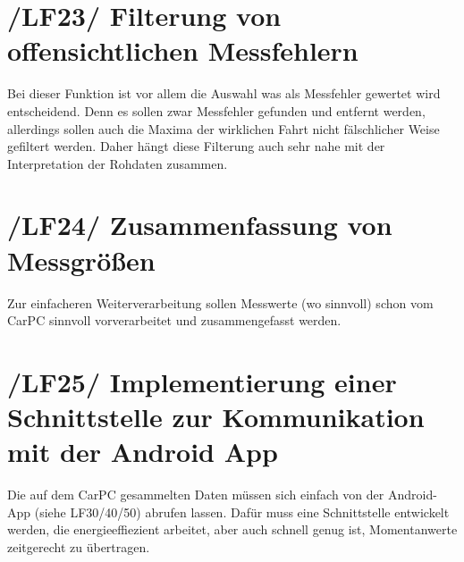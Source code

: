 \section{/LF23/ Filterung von offensichtlichen Messfehlern}
Bei dieser Funktion ist vor allem die Auswahl was als Messfehler gewertet wird entscheidend. Denn es sollen zwar Messfehler gefunden und entfernt werden, allerdings sollen auch die Maxima der wirklichen Fahrt nicht fälschlicher Weise gefiltert werden. Daher hängt diese Filterung auch sehr nahe mit der Interpretation der Rohdaten zusammen.

\section{/LF24/ Zusammenfassung von Messgrößen}
Zur einfacheren Weiterverarbeitung sollen Messwerte (wo sinnvoll) schon vom CarPC sinnvoll vorverarbeitet und zusammengefasst werden.

\section{/LF25/ Implementierung einer Schnittstelle zur Kommunikation mit der Android App}
Die auf dem CarPC gesammelten Daten müssen sich einfach von der Android-App (siehe LF30/40/50) abrufen lassen. Dafür muss eine Schnittstelle entwickelt werden, die energieeffiezient arbeitet, aber auch schnell genug ist, Momentanwerte zeitgerecht zu übertragen.